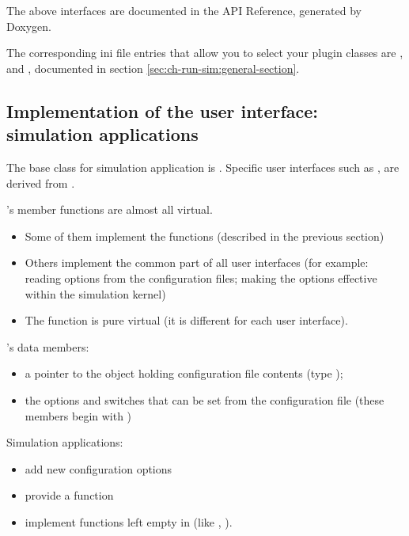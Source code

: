 The above interfaces are documented in the API Reference, generated by Doxygen.

The corresponding ini file entries that allow you to select your
plugin classes are ,
 and ,
documented in section \ref{sec:ch-run-sim:general-section}.



\subsection{Implementation of the user interface: simulation applications}

The base class for simulation application is .
Specific user interfaces such as ,
 are derived from .

's member functions are almost all virtual.
\begin{itemize}
  \item{Some of them implement the  functions
    (described in the previous section)}
  \item{Others implement the common part of all user interfaces (for
    example: reading options from the configuration files; making the
    options effective within the simulation kernel)}
  \item{The  function is pure virtual (it is different
    for each user interface).}
\end{itemize}

's data members:
\begin{itemize}
  \item{a pointer to the object holding configuration file contents
    (type );}
  \item{the options and switches that can be set from the
    configuration file (these members begin with )}
\end{itemize}

Simulation applications:
\begin{itemize}
  \item{add new configuration options}
  \item{provide a  function}
  \sloppy
  \item{implement functions left empty in  (like
    , ).}
\end{itemize}


%
%
%

